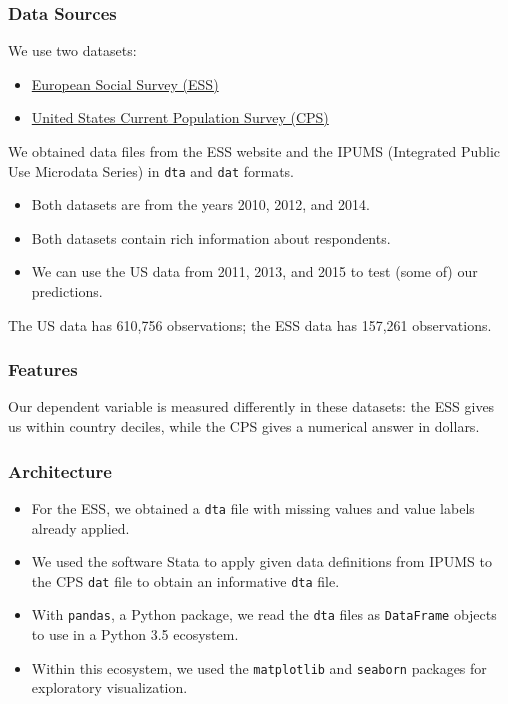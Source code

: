 \documentclass{beamer}
\let\olditem=\item
\renewcommand{\item}{\olditem \justifying}
\begin{document}
\frame %
{
  \frametitle{Data Sources}
  We use two datasets:
  \begin{itemize} 
  \item \href{http://www.europeansocialsurvey.org/}{European Social Survey (ESS)} 
  \item \href{https://cps.ipums.org/cps/index.shtml}{United States Current Population Survey (CPS)}
  \end{itemize}
  We obtained data files from the ESS website and the IPUMS (Integrated Public Use Microdata Series) in \texttt{dta} and \texttt{dat} formats.
  \begin{itemize}
  \item Both datasets are from the years 2010, 2012, and 2014.
  \item Both datasets contain rich information about respondents.
  \item We can use the US data from 2011, 2013, and 2015 to test (some of) our predictions.
  \end{itemize}
  The US data has 610,756 observations; the ESS data has 157,261 observations.
}

\frame %
{
  \frametitle{Features}
Our dependent variable is measured differently in these datasets: the ESS gives us within country deciles, while the CPS gives a numerical answer in dollars.




}




\frame %
{
  \frametitle{Architecture}
  \begin{itemize}
  \item For the ESS, we obtained a \texttt{dta} file with missing values and value labels already applied.
  \item We used the software Stata to apply given data definitions from IPUMS to the CPS \texttt{dat} file to obtain an informative \texttt{dta} file.  
  \item With \texttt{pandas}, a Python package, we read the \texttt{dta} files as \texttt{DataFrame} objects to use in a Python 3.5 ecosystem.
  \item Within this ecosystem, we used the \texttt{matplotlib} and \texttt{seaborn} packages for exploratory visualization.
  \end{itemize}



  
}
\end{document}

